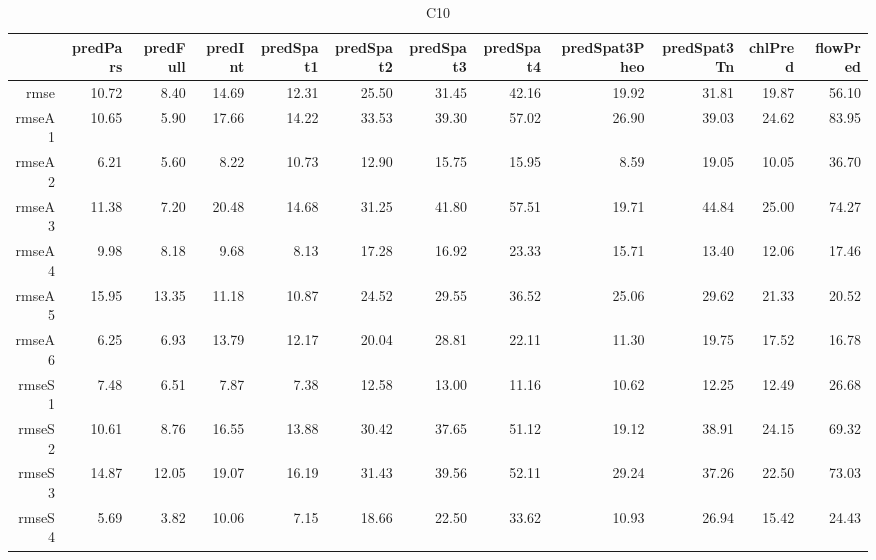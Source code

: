 \begin{table}[H]
\centering
\begingroup\fontsize{2.5pt}{4pt}\selectfont
\begin{tabular}{rrrrrrrrrrrr}
  \hline
 & predPars & predFull & predInt & predSpat1 & predSpat2 & predSpat3 & predSpat4 & predSpat3Pheo & predSpat3Tn & chlPred & flowPred \\ 
  \hline
rmse & 10.72 & 8.40 & 14.69 & 12.31 & 25.50 & 31.45 & 42.16 & 19.92 & 31.81 & 19.87 & 56.10 \\ 
  rmseA1 & 10.65 & 5.90 & 17.66 & 14.22 & 33.53 & 39.30 & 57.02 & 26.90 & 39.03 & 24.62 & 83.95 \\ 
  rmseA2 & 6.21 & 5.60 & 8.22 & 10.73 & 12.90 & 15.75 & 15.95 & 8.59 & 19.05 & 10.05 & 36.70 \\ 
  rmseA3 & 11.38 & 7.20 & 20.48 & 14.68 & 31.25 & 41.80 & 57.51 & 19.71 & 44.84 & 25.00 & 74.27 \\ 
  rmseA4 & 9.98 & 8.18 & 9.68 & 8.13 & 17.28 & 16.92 & 23.33 & 15.71 & 13.40 & 12.06 & 17.46 \\ 
  rmseA5 & 15.95 & 13.35 & 11.18 & 10.87 & 24.52 & 29.55 & 36.52 & 25.06 & 29.62 & 21.33 & 20.52 \\ 
  rmseA6 & 6.25 & 6.93 & 13.79 & 12.17 & 20.04 & 28.81 & 22.11 & 11.30 & 19.75 & 17.52 & 16.78 \\ 
  rmseS1 & 7.48 & 6.51 & 7.87 & 7.38 & 12.58 & 13.00 & 11.16 & 10.62 & 12.25 & 12.49 & 26.68 \\ 
  rmseS2 & 10.61 & 8.76 & 16.55 & 13.88 & 30.42 & 37.65 & 51.12 & 19.12 & 38.91 & 24.15 & 69.32 \\ 
  rmseS3 & 14.87 & 12.05 & 19.07 & 16.19 & 31.43 & 39.56 & 52.11 & 29.24 & 37.26 & 22.50 & 73.03 \\ 
  rmseS4 & 5.69 & 3.82 & 10.06 & 7.15 & 18.66 & 22.50 & 33.62 & 10.93 & 26.94 & 15.42 & 24.43 \\ 
   \hline
\end{tabular}
\endgroup
\caption{C10} 
\end{table}
